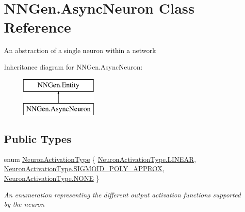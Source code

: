 \hypertarget{class_n_n_gen_1_1_async_neuron}{}\section{N\+N\+Gen.\+Async\+Neuron Class Reference}
\label{class_n_n_gen_1_1_async_neuron}


An abstraction of a single neuron within a network  


Inheritance diagram for N\+N\+Gen.\+Async\+Neuron\+:\begin{figure}[H]
\begin{center}
\leavevmode
\includegraphics[height=2.000000cm]{class_n_n_gen_1_1_async_neuron}
\end{center}
\end{figure}
\subsection*{Public Types}
\begin{DoxyCompactItemize}
\item 
enum \hyperlink{class_n_n_gen_1_1_async_neuron_afe8460a52808d1587cbcc0a8e4e23b64}{Neuron\+Activation\+Type} \{ \hyperlink{class_n_n_gen_1_1_async_neuron_afe8460a52808d1587cbcc0a8e4e23b64aaac544aacc3615aada24897a215f5046}{Neuron\+Activation\+Type.\+L\+I\+N\+E\+A\+R}, 
\hyperlink{class_n_n_gen_1_1_async_neuron_afe8460a52808d1587cbcc0a8e4e23b64a71a8e1c2711781820e9e3ce31dadfd9b}{Neuron\+Activation\+Type.\+S\+I\+G\+M\+O\+I\+D\+\_\+\+P\+O\+L\+Y\+\_\+\+A\+P\+P\+R\+O\+X}, 
\hyperlink{class_n_n_gen_1_1_async_neuron_afe8460a52808d1587cbcc0a8e4e23b64ab50339a10e1de285ac99d4c3990b8693}{Neuron\+Activation\+Type.\+N\+O\+N\+E}
 \}\begin{DoxyCompactList}\small\item\em An enumeration representing the different output activation functions supported by the neuron \end{DoxyCompactList}
\end{DoxyCompactItemize}
